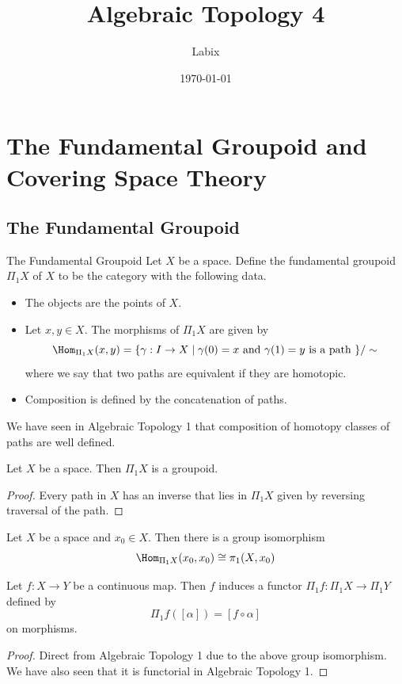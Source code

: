 \documentclass[a4paper]{article}
\title{Algebraic Topology 4}
\author{Labix}
\date{\today}
\begin{document}
\maketitle
\begin{abstract}
\end{abstract}

\pagebreak
\tableofcontents

\pagebreak
\section{The Fundamental Groupoid and Covering Space Theory}
\subsection{The Fundamental Groupoid}
\begin{defn}{The Fundamental Groupoid}{} Let $X$ be a space. Define the fundamental groupoid $\Pi_1X$ of $X$ to be the category with the following data. 
\begin{itemize}
\item The objects are the points of $X$. 
\item Let $x,y\in X$. The morphisms of $\Pi_1X$ are given by $$\Hom_{\Pi_1X}(x,y)=\{\gamma:I\to X\;|\;\gamma(0)=x\text{ and }\gamma(1)=y\text{ is a path }\}/\sim$$ where we say that two paths are equivalent if they are homotopic. 
\item Composition is defined by the concatenation of paths. 
\end{itemize}
\end{defn}

We have seen in Algebraic Topology 1 that composition of homotopy classes of paths are well defined. 

\begin{lmm}{}{} Let $X$ be a space. Then $\Pi_1X$ is a groupoid. \tcbline
\begin{proof}
Every path in $X$ has an inverse that lies in $\Pi_1X$ given by reversing traversal of the path. 
\end{proof}
\end{lmm}

\begin{lmm}{}{} Let $X$ be a space and $x_0\in X$. Then there is a group isomorphism $$\Hom_{\Pi_1X}(x_0,x_0)\cong\pi_1(X,x_0)$$
\end{lmm}

\begin{prp}{}{} Let $f:X\to Y$ be a continuous map. Then $f$ induces a functor $\Pi_1f:\Pi_1X\to\Pi_1Y$ defined by $$\Pi_1f([\alpha])=[f\circ\alpha]$$ on morphisms. \tcbline
\begin{proof}
Direct from Algebraic Topology 1 due to the above group isomorphism. We have also seen that it is functorial in Algebraic Topology 1. 
\end{proof}
\end{prp}
\end{document}
